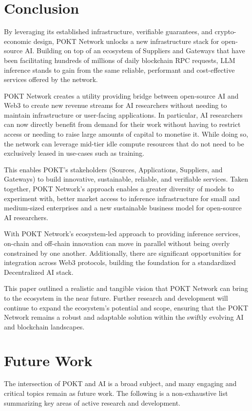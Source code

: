 \documentclass[conference,compsoc]{IEEEtran}
\begin{document}
\section{Conclusion}
By leveraging its established infrastructure, verifiable guarantees, and crypto-economic design, POKT Network unlocks a new infrastructure stack for open-source AI. Building on top of an ecosystem of Suppliers and Gateways that have been facilitating hundreds of millions of daily blockchain RPC requests, LLM inference stands to gain from the same reliable, performant and cost-effective services offered by the network.

POKT Network creates a utility providing bridge between open-source AI and Web3 to create new revenue streams for AI researchers without needing to maintain infrastructure or user-facing applications. In particular, AI researchers can now directly benefit from demand for their work without having to restrict access or needing to raise large amounts of capital to monetise it. While doing so, the network can leverage mid-tier idle compute resources that do not need to be exclusively leased in use-cases such as training. 

This enables POKT's stakeholders (Sources, Applications, Suppliers, and Gateways) to build innovative, sustainable, reliable, and verifiable services. Taken together, POKT Network’s approach enables a greater diversity of models to experiment with, better market access to inference infrastructure for small and medium-sized enterprises and a new sustainable business model for open-source AI researchers.

With POKT Network’s ecosystem-led approach to providing inference services, on-chain and off-chain innovation can move in parallel without being overly constrained by one another. Additionally, there are significant opportunities for integration across Web3 protocols, building the foundation for a standardized Decentralized AI stack.

This paper outlined a realistic and tangible vision that POKT Network can bring to the ecosystem in the near future. Further research and development will continue to expand the ecosystem's potential and scope, ensuring that the POKT Network remains a robust and adaptable solution within the swiftly evolving AI and blockchain landscapes.

\section{Future Work}
The intersection of POKT and AI is a broad subject, and many engaging and critical topics remain as future work. The following is a non-exhaustive list summarizing key areas of active research and development.
\end{document}
